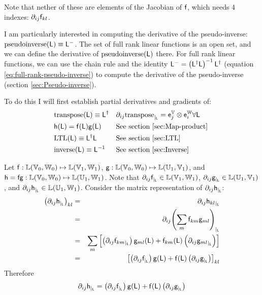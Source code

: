 Note that nether of these are elements of the Jacobian of $\mathsf{f}$,
which needs 4 indexes: ${\partial}_{ij}{\mathsf{f}_{kl}}$.

I am particularly interested in computing the derivative of the
pseudo-inverse: $\mathrm{pseudoinverse}(\mathsf{L}) \equiv \mathsf{L}^{-}$.
The set of full rank linear functions is an open set,
and we can define the derivative of $\mathrm{pseudoinverse}(\mathsf{L})$ there.
For full rank linear functions,
we can use the chain rule and the identity
$\mathsf{L}^{-} = \left( \mathsf{L}^{\dagger} \mathsf{L} \right)^{-1} \mathsf{L}^{\dagger}$
(equation \ref{eq:full-rank-pseudo-inverse})
to compute the derivative of the pseudo-inverse
(section \ref{sec:Pseudo-inverse}).

To do this I will first establish partial derivatives and gradients of:
\begin{align}
\label{eq:transpose-derivative}
&\mathrm{transpose}(\mathsf{L}) \equiv \mathsf{L}^{\dagger}
&&{\partial}_{ij}{\mathrm{transpose}}_{\mid_{\mathsf{L}}} =  \mathsf{e}_j^{\mathbb{V}} \otimes \mathsf{e}_i^{\mathbb{W}}
\forall \mathsf{L}
\\
&\mathsf{h}( \mathsf{L} ) = \mathsf{f} ( \mathsf{L} ) \mathsf{g} ( \mathsf{L} )
&&\text{See section \ref{sec:Map-product} }
\\
&\mathrm{LTL}(\mathsf{L}) \equiv \mathsf{L}^{\dagger} \mathsf{L}
&&\text{See section \ref{sec:LTL} }
\\
&\mathrm{inverse}(\mathsf{L}) \equiv \mathsf{L}^{-1}
&&\text{See section \ref{sec:Inverse} }
\end{align}

\label{sec:Map-product}

Let
$\mathsf{f} : \mathbb{L}(\mathbb{V}_0,\mathbb{W}_0) \mapsto \mathbb{L}(\mathbb{V}_1,\mathbb{W}_1)$,
$\mathsf{g} : \mathbb{L}(\mathbb{V}_0,\mathbb{W}_0) \mapsto \mathbb{L}(\mathbb{U}_1,\mathbb{V}_1)$,
and
$\mathsf{h} = \mathsf{f}\mathsf{g} : \mathbb{L}(\mathbb{V}_0,\mathbb{W}_0) \mapsto \mathbb{L}(\mathbb{U}_1,\mathbb{W}_1)$.
Note that
${\partial}_{ij}{\mathsf{f}}_{\mid_{\mathsf{L}}} \in  \mathbb{L}(\mathbb{V}_1,\mathbb{W}_1)$,
${\partial}_{ij}{\mathsf{g}}_{\mid_{\mathsf{L}}} \in  \mathbb{L}(\mathbb{U}_1,\mathbb{V}_1)$,
and
${\partial}_{ij}{\mathsf{h}}_{\mid_{\mathsf{L}}} \in  \mathbb{L}(\mathbb{U}_1,\mathbb{W}_1)$.
Consider the matrix representation of ${\partial}_{ij}{\mathsf{h}}_{\mid_{\mathsf{L}}}$:
\begin{eqnarray}
\left( {\partial}_{ij}{\mathsf{h}}_{\mid_{\mathsf{L}}} \right)_{kl}
& = &
{\partial}_{ij}{\mathsf{h}_{kl}}_{\mid_{\mathsf{L}}}
\\
& = &
{\partial}_{ij}{\left( \sum_{m} \mathsf{f}_{km} \mathsf{g}_{ml} \right)}_{\mid_{\mathsf{L}}}
\nonumber
\\
& = &
\sum_{m}  \left[
\left( {\partial}_{ij}{\mathsf{f}_{km}}_{\mid_{\mathsf{L}}} \right) \mathsf{g}_{ml}(\mathsf{L})
+
\mathsf{f}_{km}(\mathsf{L}) \left( {\partial}_{ij}{\mathsf{g}_{ml}}_{\mid_{\mathsf{L}}} \right)
\right]
\nonumber
\\
& = &
\left[
\left( {\partial}_{ij}{\mathsf{f}}_{\mid_{\mathsf{L}}} \right) \mathsf{g}(\mathsf{L})
+
\mathsf{f}(\mathsf{L}) \left( {\partial}_{ij}{\mathsf{g}}_{\mid_{\mathsf{L}}} \right)
\right]_{kl}
\nonumber
\end{eqnarray}
Therefore
\begin{equation}
\label{eq:function-product-derivative}
{\partial}_{ij}{\mathsf{h}}_{\mid_{\mathsf{L}}}
 =
\left( {\partial}_{ij}{\mathsf{f}}_{\mid_{\mathsf{L}}} \right) \mathsf{g}(\mathsf{L})
+
\mathsf{f}(\mathsf{L}) \left( {\partial}_{ij}{\mathsf{g}}_{\mid_{\mathsf{L}}} \right)
\end{equation}

